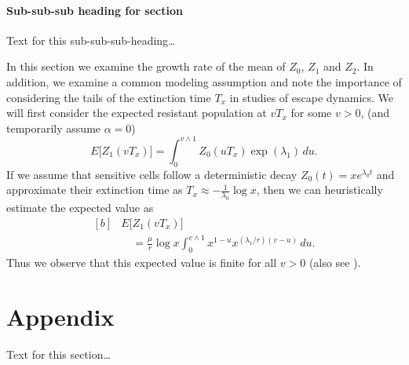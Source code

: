\documentclass{bmcart}
\begin{document}
	\paragraph*{Sub-sub-sub heading for section}
	Text for this sub-sub-sub-heading\ldots
	
	In this section we examine the growth rate of the mean of $Z_0$, $Z_1$ and $Z_2$. In
	addition, we examine a common modeling assumption and note the
	importance of considering the tails of the extinction time $T_x$ in
	studies of escape dynamics.
	We will first consider the expected resistant population at $vT_x$ for
	some $v>0$, (and temporarily assume $\alpha=0$)
	\[
	E \bigl[Z_1(vT_x) \bigr]=
	\int_0^{v\wedge
		1}Z_0(uT_x)
	\exp (\lambda_1)\,du .
	\]
	If we assume that sensitive cells follow a deterministic decay
	$Z_0(t)=xe^{\lambda_0 t}$ and approximate their extinction time as
	$T_x\approx-\frac{1}{\lambda_0}\log x$, then we can heuristically
	estimate the expected value as
	\begin{equation}\label{eqexpmuts}
		\begin{aligned}[b]
			&      E\bigl[Z_1(vT_x)\bigr]\\
			&\quad      = \frac{\mu}{r}\log x
			\int_0^{v\wedge1}x^{1-u}x^{({\lambda_1}/{r})(v-u)}\,du .
		\end{aligned}
	\end{equation}
	Thus we observe that this expected value is finite for all $v>0$ (also see \cite{koon,xjon,marg,schn,koha,issnic}).
	
	
	\section*{Appendix}
	Text for this section\ldots
	
	
\end{document}
